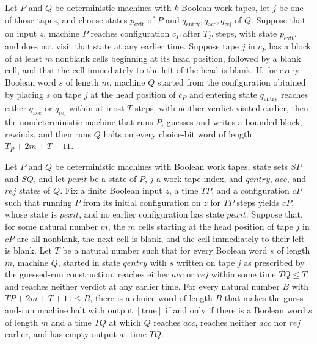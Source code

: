 \begin{theorem}
\label{Turing.guessRunTM_haltsWithin}
\leanok
{}
Let $P$ and $Q$ be deterministic machines with $k$ Boolean work tapes, let $j$ be one of
those tapes, and choose states $p_{\mathrm{exit}}$ of $P$ and
$q_{\mathrm{entry}},q_{\mathrm{acc}},q_{\mathrm{rej}}$ of $Q$. Suppose that on input
$z$, machine $P$ reaches configuration $c_P$ after $T_P$ steps, with state
$p_{\mathrm{exit}}$, and does not visit that state at any earlier time. Suppose tape $j$
in $c_P$ has a block of at least $m$ nonblank cells beginning at its head position,
followed by a blank cell, and that the cell immediately to the left of the head is
blank. If, for every Boolean word $s$ of length $m$, machine $Q$ started from the
configuration obtained by placing $s$ on tape $j$ at the head position of $c_P$ and
entering state $q_{\mathrm{entry}}$ reaches either $q_{\mathrm{acc}}$ or
$q_{\mathrm{rej}}$ within at most $T$ steps, with neither verdict visited earlier, then
the nondeterministic machine that runs $P$, guesses and writes a bounded block, rewinds,
and then runs $Q$ halts on every choice-bit word of length $T_P+2m+T+11$.
\end{theorem}

\begin{theorem}
\label{Turing.guessRunTM_accepts_iff}
\leanok
{}
Let $P$ and $Q$ be deterministic machines with Boolean work tapes, state sets $SP$ and
$SQ$, and let $pexit$ be a state of $P$, $j$ a work-tape index, and $qentry$, $acc$, and
$rej$ states of $Q$. Fix a finite Boolean input $z$, a time $TP$, and a configuration
$cP$ such that running $P$ from its initial configuration on $z$ for $TP$ steps yields
$cP$, whose state is $pexit$, and no earlier configuration has state $pexit$. Suppose
that, for some natural number $m$, the $m$ cells starting at the head position of tape
$j$ in $cP$ are all nonblank, the next cell is blank, and the cell immediately to their
left is blank. Let $T$ be a natural number such that for every Boolean word $s$ of
length $m$, machine $Q$, started in state $qentry$ with $s$ written on tape $j$ as
prescribed by the guessed-run construction, reaches either $acc$ or $rej$ within some
time $TQ\le T$, and reaches neither verdict at any earlier time. For every natural
number $B$ with $TP+2m+T+11\le B$, there is a choice word of length $B$ that makes the
guess-and-run machine halt with output $[\mathrm{true}]$ if and only if there is a
Boolean word $s$ of length $m$ and a time $TQ$ at which $Q$ reaches $acc$, reaches
neither $acc$ nor $rej$ earlier, and has empty output at time $TQ$.
\end{theorem}

